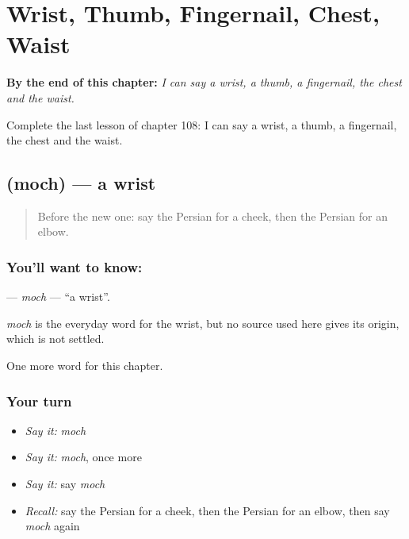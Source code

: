 
\chapter{Wrist, Thumb, Fingernail, Chest, Waist}
\label{ch:fa-wrist-thumb-fingernail-chest-waist}

\begin{chapteropening}
\textbf{By the end of this chapter:} \emph{I can say a wrist, a thumb, a fingernail, the chest and the waist.}

Complete the last lesson of chapter 108: I can say a wrist, a thumb, a fingernail, the chest and the waist.
\end{chapteropening}

\section[\texorpdfstring{\fa{مچ} (moch)}{مچ (moch)}]{ (moch) — a wrist}

\label{lesson:FA-C108-moch}



\begin{quote}
Before the new one: say the Persian for a cheek, then the Persian for an elbow.
\end{quote}

\subsection*{You'll want to know: }
\textbf{} — \emph{moch} — \textquotedblleft{}a wrist\textquotedblright{}.

\begin{cousinweb}
\emph{moch} is the everyday word for the wrist, but no source used here gives its origin, which is not settled.
\end{cousinweb}

\begin{grammarlens}[title={What you've built}]
One more word for this chapter.
\end{grammarlens}

\subsection*{Your turn}
\begin{itemize}
\raggedright
  \item \emph{Say it:} \emph{moch}
  \item \emph{Say it:} \emph{moch}, once more
  \item \emph{Say it:} say \emph{moch}
  \item \emph{Recall:} say the Persian for a cheek, then the Persian for an elbow, then say \emph{moch} again
\end{itemize}


